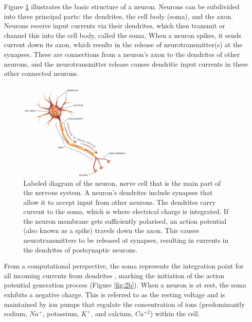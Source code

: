 \noindent Figure \ref{fig:2a} illustrates the basic structure of a neuron. Neurons can be subdivided into three principal parts: the dendrites, the cell body (soma), and the axon. Neurons receive input currents via their dendrites, which then transmit or channel this into the cell body, called the soma. When a neuron spikes, it sends current down its axon, which results in the release of neurotransmitter(s) at the synapses. These are connections from a neuron's axon to the dendrites of other neurons, and the neurotransmitter release causes dendritic input currents in these other connected neurons. \\

\begin{figure}[htbp!] 
    \centering    
    \includegraphics[width=0.5\textwidth]{Chapter2/Figs/a.png}
    \caption[Labeled diagram of the neuron.]{Labeled diagram of the neuron, nerve cell that is the main part of the nervous system. A neuron's dendrites include synapses that allow it to accept input from other neurons. The dendrites carry current to the soma, which is where electrical charge is integrated. If the neuron membrane gets sufficiently polarised, an action potential (also known as a spike) travels down the axon. This causes neurotransmitters to be released at synapses, resulting in currents in the dendrites of postsynaptic neurons.}
    \label{fig:2a}
    \end{figure}

\noindent From a computational perspective, the soma represents the integration point for all incoming currents from dendrites \cite{polsky2004computational}, marking the initiation of the action potential generation process (Figure \ref{fig:2b}). When a neuron is at rest, the soma exhibits a negative charge. This is referred to as the resting voltage and is maintained by ion pumps that regulate the concentration of ions (predominantly sodium, $Na^+$, potassium, $K^+$, and calcium, $Ca^{+2}$) within the cell. \\



